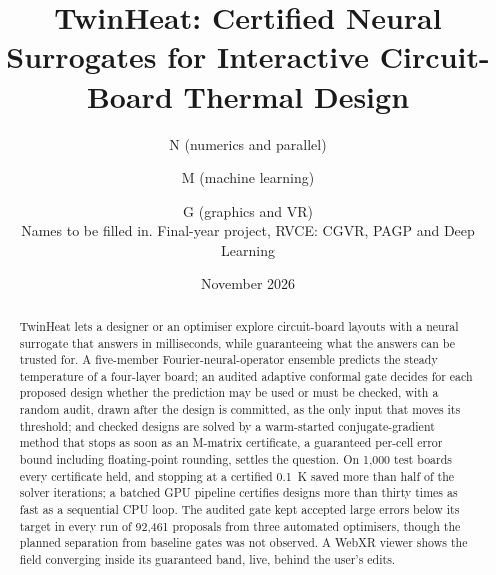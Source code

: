 \documentclass[11pt,a4paper]{report}
\title{TwinHeat: Certified Neural Surrogates for Interactive Circuit-Board Thermal Design}
\author{N (numerics and parallel) \and M (machine learning) \and G (graphics and VR)\\[1ex]
\small Names to be filled in. Final-year project, RVCE: CGVR, PAGP and Deep Learning}
\date{November 2026}
\begin{document}
\maketitle

\begin{abstract}
TwinHeat lets a designer or an optimiser explore circuit-board layouts with a neural surrogate
that answers in milliseconds, while guaranteeing what the answers can be trusted for. A
five-member Fourier-neural-operator ensemble predicts the steady temperature of a four-layer board;
an audited adaptive conformal gate decides for each proposed design whether the prediction may be
used or must be checked, with a random audit, drawn after the design is committed, as the only
input that moves its threshold; and checked designs are solved by a warm-started conjugate-gradient
method that stops as soon as an M-matrix certificate, a guaranteed per-cell error bound including
floating-point rounding, settles the question. On 1{,}000 test boards every certificate held, and
stopping at a certified 0.1~K saved more than half of the solver iterations; a batched GPU pipeline
certifies designs more than thirty times as fast as a sequential CPU loop. The audited gate kept
accepted large errors below its target in every run of 92{,}461 proposals from three automated
optimisers, though the planned separation from baseline gates was not observed. A WebXR viewer
shows the field converging inside its guaranteed band, live, behind the user's edits.
\end{abstract}

\tableofcontents







\appendix




\end{document}
